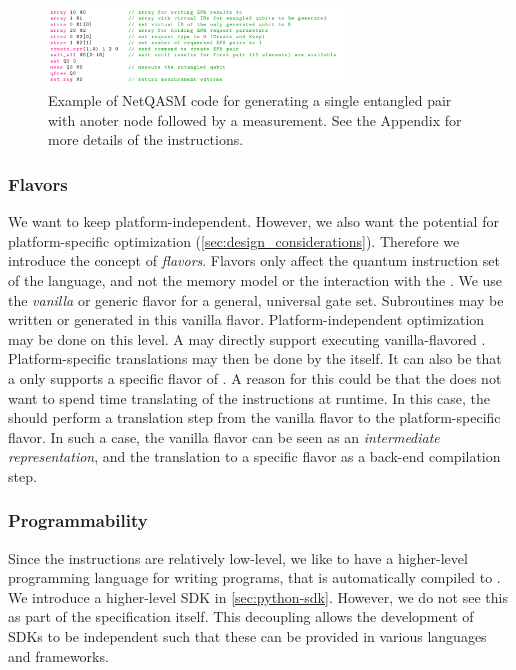 \begin{figure}
      \centering
      \includegraphics[width=0.7\textwidth]{figures/netqasm/nqasm_code_example}
      \caption{Example of NetQASM code for generating a single entangled pair with anoter node followed by a measurement.
            See the Appendix for more details of the instructions.}
      \label{fig:nqasm_code_example}
\end{figure}

\subsubsection{Flavors}
\label{sec:design_decisions_flavours}
We want to keep \netqasm platform-independent.
However, we also want the potential for platform-specific optimization (\cref{sec:design_considerations}).
Therefore we introduce the concept of \textit{flavors}.
Flavors only affect the quantum instruction set of the language, and not the memory model or the interaction with the \QNPU.
We use the \textit{vanilla} or generic flavor for a general, universal gate set.
Subroutines may be written or generated in this vanilla flavor.
Platform-independent optimization may be done on this level.
A \QNPU may directly support executing vanilla-flavored \netqasm.
Platform-specific translations may then be done by the \QNPU itself.
It can also be that a \QNPU only supports a specific flavor of \netqasm.
A reason for this could be that the \QNPU does not want to spend time translating of the instructions at runtime.
In this case, the \host should perform a translation step from the vanilla flavor to the platform-specific flavor.
In such a case, the vanilla flavor can be seen as an \textit{intermediate representation}, and the translation to a specific flavor as a back-end compilation step.

\subsubsection{Programmability}
Since the \netqasm instructions are relatively low-level, we like to have a higher-level programming language for writing programs, that is automatically compiled to \netqasm.
We introduce a higher-level SDK in \cref{sec:python-sdk}.
However, we do not see this as part of the \netqasm specification itself.
This decoupling allows the development of SDKs to be independent such that these can be provided in various languages and frameworks.

